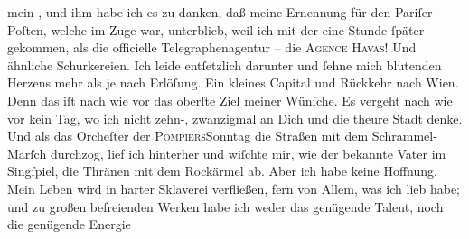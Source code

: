                mein \label{K_L02669-14v}\label{K_L02669-14}, und ihm
               habe ich es zu danken, daß \strikeout{\textcolor{gray}{man}} meine Ernennung für den Pariſer Poſten,
               welche im Zuge war, unterblieb, weil ich mit der \label{K_L02669-15v}\label{K_L02669-15} eine Stunde ſpäter gekommen, als die officielle
               Telegraphenagentur \textcolor{gray}{–} die \textsc{Agence Havas}! Und ähnliche Schurkereien. Ich leide entſetzlich darunter und ſehne mich
               blutenden Herzens mehr als je nach Erlöſung. Ein kleines Capital und Rückkehr nach
                  Wien. Denn das iſt nach wie vor das oberſte
               Ziel meiner Wünſche. Es vergeht nach wie vor kein Tag, {\pb}wo ich nicht zehn-, zwanzigmal an Dich und die
               theure Stadt denke. Und als das
                  Orcheſter der \textsc{Pompiers}Sonntag die Straßen mit dem Schrammel-Marſch durchzog, lief ich
               hinterher und wiſchte mir, wie der bekannte Vater im Singſpiel, die Thränen mit dem Rockärmel
               ab. Aber ich habe keine Hoffnung. Mein Leben wird in harter Sklaverei verfließen,
               fern von Allem, was ich lieb habe; und zu großen befreienden Werken habe ich weder
               das genügende Talent, noch die genügende Energie{\dotsfive}\pend
           
